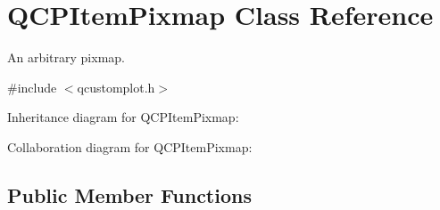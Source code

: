 \hypertarget{class_q_c_p_item_pixmap}{}\section{Q\+C\+P\+Item\+Pixmap Class Reference}
\label{class_q_c_p_item_pixmap}


An arbitrary pixmap.  




{\ttfamily \#include $<$qcustomplot.\+h$>$}



Inheritance diagram for Q\+C\+P\+Item\+Pixmap\+:


Collaboration diagram for Q\+C\+P\+Item\+Pixmap\+:
\subsection*{Public Member Functions}
